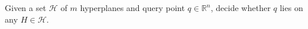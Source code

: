 \begin{problem}
	Given a set \(\mathcal{H}\) of \(m\) hyperplanes and query point
	\(q\in\mathbb{R}^n\),
	decide whether \(q\) lies on any \(H \in \mathcal{H}\).
\end{problem}
